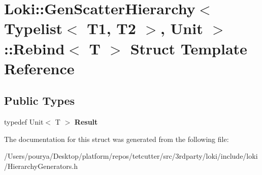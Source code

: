 \hypertarget{structLoki_1_1GenScatterHierarchy_3_01Typelist_3_01T1_00_01T2_01_4_00_01Unit_01_4_1_1Rebind}{}\section{Loki\+:\+:Gen\+Scatter\+Hierarchy$<$ Typelist$<$ T1, T2 $>$, Unit $>$\+:\+:Rebind$<$ T $>$ Struct Template Reference}
\label{structLoki_1_1GenScatterHierarchy_3_01Typelist_3_01T1_00_01T2_01_4_00_01Unit_01_4_1_1Rebind}
\subsection*{Public Types}
\begin{DoxyCompactItemize}
\item 
\hypertarget{structLoki_1_1GenScatterHierarchy_3_01Typelist_3_01T1_00_01T2_01_4_00_01Unit_01_4_1_1Rebind_a1a5714cbc28a586fb607796d122c2333}{}typedef Unit$<$ T $>$ {\bfseries Result}\label{structLoki_1_1GenScatterHierarchy_3_01Typelist_3_01T1_00_01T2_01_4_00_01Unit_01_4_1_1Rebind_a1a5714cbc28a586fb607796d122c2333}

\end{DoxyCompactItemize}


The documentation for this struct was generated from the following file\+:\begin{DoxyCompactItemize}
\item 
/\+Users/pourya/\+Desktop/platform/repos/tetcutter/src/3rdparty/loki/include/loki/Hierarchy\+Generators.\+h\end{DoxyCompactItemize}
